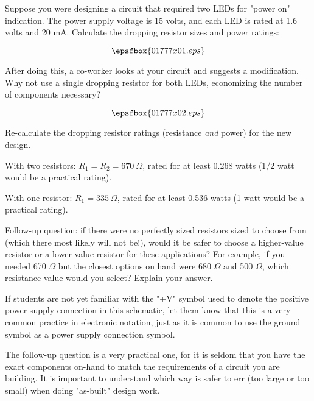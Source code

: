 

Suppose you were designing a circuit that required two LEDs for "power on" indication.  The power supply voltage is 15 volts, and each LED is rated at 1.6 volts and 20 mA.  Calculate the dropping resistor sizes and power ratings:

$$\epsfbox{01777x01.eps}$$

After doing this, a co-worker looks at your circuit and suggests a modification.  Why not use a single dropping resistor for both LEDs, economizing the number of components necessary?

$$\epsfbox{01777x02.eps}$$

Re-calculate the dropping resistor ratings (resistance {\it and} power) for the new design.







With two resistors: $R_1 = R_2 = 670 \> \Omega$, rated for at least 0.268 watts (1/2 watt would be a practical rating). 

\vskip 10pt

With one resistor: $R_1 = 335 \> \Omega$, rated for at least 0.536 watts (1 watt would be a practical rating). 

\vskip 10pt

Follow-up question: if there were no perfectly sized resistors sized to choose from (which there most likely will not be!), would it be safer to choose a higher-value resistor or a lower-value resistor for these applications?  For example, if you needed 670 $\Omega$ but the closest options on hand were 680 $\Omega$ and 500 $\Omega$, which resistance value would you select?  Explain your answer.







If students are not yet familiar with the "+V" symbol used to denote the positive power supply connection in this schematic, let them know that this is a very common practice in electronic notation, just as it is common to use the ground symbol as a power supply connection symbol.

The follow-up question is a very practical one, for it is seldom that you have the exact components on-hand to match the requirements of a circuit you are building.  It is important to understand which way is safer to err (too large or too small) when doing "as-built" design work.




